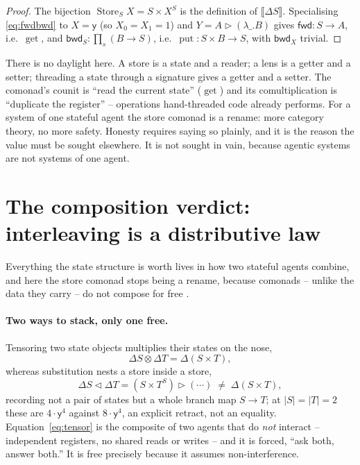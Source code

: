 \documentclass[11pt]{amsart}
\newcommand{\ctr}{\mathbin{\triangleright}}      %
\newcommand{\ext}[1]{\llbracket #1 \rrbracket}    %
\newcommand{\comp}{\mathbin{\triangleleft}}       %
\newcommand{\fwd}{\mathsf{fwd}}
\newcommand{\bwd}{\mathsf{bwd}}
\newcommand{\y}{\mathsf{y}}
\DeclareMathOperator{\Store}{Store}
\DeclareMathOperator{\getop}{get}
\DeclareMathOperator{\putop}{put}
\theoremstyle{plain}
\theoremstyle{definition}
\theoremstyle{remark}
\begin{document}
\begin{proof}
The bijection $\Store_S X=S\times X^S$ is the definition of $\ext{\Delta S}$. Specialising
\eqref{eq:fwdbwd} to $X=\y$ (so $X_0=X_1=1$) and $Y=A\ctr(\lambda\_.B)$ gives $\fwd:S\to A$, i.e.\
$\getop$, and $\bwd_S:\prod_s(B\to S)$, i.e.\ $\putop:S\times B\to S$, with $\bwd_X$ trivial.
\end{proof}

\noindent There is no daylight here. A store is a state and a reader; a lens is a getter and a
setter; threading a state through a signature gives a getter and a setter. The comonad's counit is
``read the current state'' ($\getop$) and its comultiplication is ``duplicate the register'' --
operations hand-threaded code already performs. For a system of one stateful agent the store comonad
is a rename: more category theory, no more safety. Honesty requires saying so plainly, and it is the
reason the value must be sought elsewhere. It is not sought in vain, because agentic systems are not
systems of one agent.

\section{The composition verdict: interleaving is a distributive law}\label{sec:compose}

Everything the state structure is worth lives in how two stateful agents combine, and here the store
comonad stops being a rename, because comonads -- unlike the data they carry -- do not compose for
free \cite{ahmanuustaluDL}.

\paragraph{Two ways to stack, only one free.}
Tensoring two state objects multiplies their states on the nose,
\begin{equation}\label{eq:tensor}
  \Delta S\otimes\Delta T=\Delta(S\times T),
\end{equation}
whereas substitution nests a store inside a store,
\begin{equation}\label{eq:nest}
  \Delta S\comp\Delta T=(S\times T^{S})\ctr(\cdots)\;\ne\;\Delta(S\times T),
\end{equation}
recording not a pair of states but a whole branch map $S\to T$; at $|S|=|T|=2$ these are
$4\cdot\y^4$ against $8\cdot\y^4$, an explicit retract, not an equality. Equation~\eqref{eq:tensor}
is the composite of two agents that do \emph{not} interact -- independent registers, no shared reads
or writes -- and it is forced, ``ask both, answer both.'' It is free precisely because it assumes
non-interference.
\end{document}

